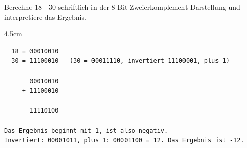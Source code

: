 \question[4]
Berechne 18 - 30 schriftlich in der 8-Bit Zweierkomplement-Darstellung und interpretiere das Ergebnis.
\begin{solutionbox}{4.5cm}
\begin{lstlisting}
  18 = 00010010
 -30 = 11100010   (30 = 00011110, invertiert 11100001, plus 1)

       00010010
     + 11100010
     ----------
       11110100

Das Ergebnis beginnt mit 1, ist also negativ.
Invertiert: 00001011, plus 1: 00001100 = 12. Das Ergebnis ist -12.
\end{lstlisting}
\end{solutionbox}
